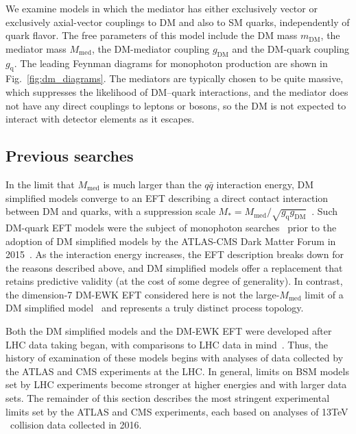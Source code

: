 We examine models in which the mediator has either exclusively vector or exclusively axial-vector couplings to DM and also to SM quarks, independently
of quark flavor. The free parameters of this model include
the DM mass $m_\mathrm{DM}$, the mediator mass $M_\mathrm{med}$, the DM-mediator coupling $g_\mathrm{DM}$ and the DM-quark coupling $g_\mathrm{q}$.
The leading Feynman diagrams for monophoton production are shown in Fig.~\ref{fig:dm_diagrams}. The mediators are typically chosen to be quite massive,
which suppresses the likelihood of DM--quark interactions, and the mediator does not have any direct couplings to leptons or bosons,
so the DM is not expected to interact with detector elements as it escapes.

\subsection{Previous searches} \label{sec:introduction_dm_previous_searches}
In the limit that $M_\mathrm{med}$ is much larger than the $q\bar{q}$ interaction energy, DM simplified models converge to an EFT describing a direct contact
interaction between DM and quarks, with a suppression scale $M_\mathrm{*} = M_\mathrm{med}/\sqrt{g_\mathrm{q}g_\mathrm{DM}}$~\cite{ref:1603.04156}.
Such DM-quark EFT models were the subject of monophoton searches~\cite{ref:j.physletb.2016.01.057, ref:PhysRevD.91.012008} prior to the adoption of
DM simplified models by the ATLAS-CMS Dark Matter Forum in 2015~\cite{ref:1507.00966}.
As the interaction energy increases, the EFT description breaks down for the reasons described above, and DM simplified models
offer a replacement that retains predictive validity (at the cost of some degree of generality).
In contrast, the dimension-7 DM-EWK EFT considered here is not the large-$M_\mathrm{med}$ limit of a DM simplified model~\cite{ref:1507.00966} and represents a truly distinct
process topology.

Both the DM simplified models and the DM-EWK EFT were developed after LHC data taking began, with comparisons to LHC data in mind~\cite{ref:1507.00966, ref:PhysRevD.89.056011}.
Thus, the history of examination of these models begins with analyses of data collected by the ATLAS and CMS experiments at the LHC.
In general, limits on BSM models set by LHC experiments become stronger at higher energies and with larger data sets.
The remainder of this section describes the most stringent experimental limits set by the ATLAS and CMS experiments, each based on analyses of 13\unit{TeV} \Pp\Pp\ collision data
collected in 2016.

